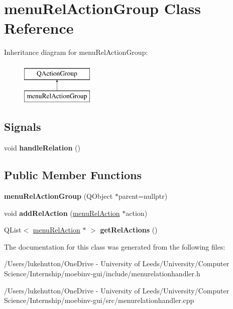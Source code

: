 \hypertarget{classmenu_rel_action_group}{}\section{menu\+Rel\+Action\+Group Class Reference}
\label{classmenu_rel_action_group}
Inheritance diagram for menu\+Rel\+Action\+Group\+:\begin{figure}[H]
\begin{center}
\leavevmode
\includegraphics[height=2.000000cm]{classmenu_rel_action_group}
\end{center}
\end{figure}
\subsection*{Signals}
\begin{DoxyCompactItemize}
\item 
\mbox{\label{classmenu_rel_action_group_a35a2675819196b79afc8f0c3701b10ed}} 
void {\bfseries handle\+Relation} ()
\end{DoxyCompactItemize}
\subsection*{Public Member Functions}
\begin{DoxyCompactItemize}
\item 
\mbox{\label{classmenu_rel_action_group_ac43afaa3a021c3543d31e2401944938e}} 
{\bfseries menu\+Rel\+Action\+Group} (Q\+Object $\ast$parent=nullptr)
\item 
\mbox{\label{classmenu_rel_action_group_a7b36eb218ae45fd971c1bfca5eb465c4}} 
void {\bfseries add\+Rel\+Action} (\mbox{\hyperlink{classmenu_rel_action}{menu\+Rel\+Action}} $\ast$action)
\item 
\mbox{\label{classmenu_rel_action_group_ac050bdcde34d72fc17c4fed70d2bfa6c}} 
Q\+List$<$ \mbox{\hyperlink{classmenu_rel_action}{menu\+Rel\+Action}} $\ast$ $>$ {\bfseries get\+Rel\+Actions} ()
\end{DoxyCompactItemize}


The documentation for this class was generated from the following files\+:\begin{DoxyCompactItemize}
\item 
/\+Users/lukehutton/\+One\+Drive -\/ University of Leeds/\+University/\+Computer Science/\+Internship/moebinv-\/gui/include/menurelationhandler.\+h\item 
/\+Users/lukehutton/\+One\+Drive -\/ University of Leeds/\+University/\+Computer Science/\+Internship/moebinv-\/gui/src/menurelationhandler.\+cpp\end{DoxyCompactItemize}
